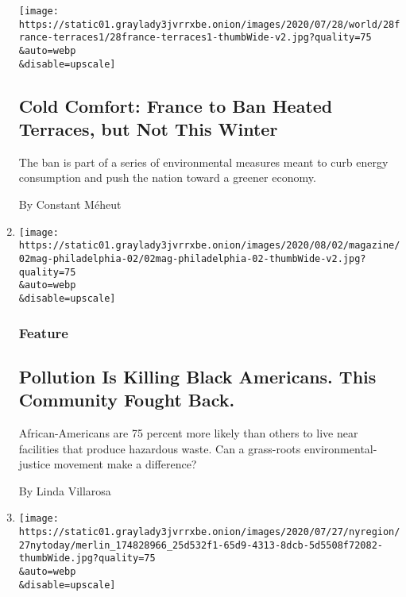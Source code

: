 \begin{enumerate}
  \texttt{[image: https://static01.graylady3jvrrxbe.onion/images/2020/07/28/world/28france-terraces1/28france-terraces1-thumbWide-v2.jpg?quality=75\\\&auto=webp\\\&disable=upscale]}

  \hypertarget{cold-comfort-france-to-ban-heated-terraces-but-not-this-winter}{%
  \subsection{Cold Comfort: France to Ban Heated Terraces, but Not This
  Winter}\label{cold-comfort-france-to-ban-heated-terraces-but-not-this-winter}}

  The ban is part of a series of environmental measures meant to curb
  energy consumption and push the nation toward a greener economy.

  By Constant Méheut
\item
  \href{/2020/07/28/magazine/pollution-philadelphia-black-americans.html}{}

  \texttt{[image: https://static01.graylady3jvrrxbe.onion/images/2020/08/02/magazine/02mag-philadelphia-02/02mag-philadelphia-02-thumbWide-v2.jpg?quality=75\\\&auto=webp\\\&disable=upscale]}

  \hypertarget{feature}{%
  \subsubsection{Feature}\label{feature}}

  \hypertarget{pollution-is-killing-black-americans-this-community-fought-back}{%
  \subsection{Pollution Is Killing Black Americans. This Community
  Fought
  Back.}\label{pollution-is-killing-black-americans-this-community-fought-back}}

  African-Americans are 75 percent more likely than others to live near
  facilities that produce hazardous waste. Can a grass-roots
  environmental-justice movement make a difference?

  By Linda Villarosa
\item
  \href{/2020/07/27/nyregion/nyc-midtown-manhattan-coronavirus.html}{}

  \texttt{[image: https://static01.graylady3jvrrxbe.onion/images/2020/07/27/nyregion/27nytoday/merlin\_174828966\_25d532f1-65d9-4313-8dcb-5d5508f72082-thumbWide.jpg?quality=75\\\&auto=webp\\\&disable=upscale]}


\end{enumerate}
